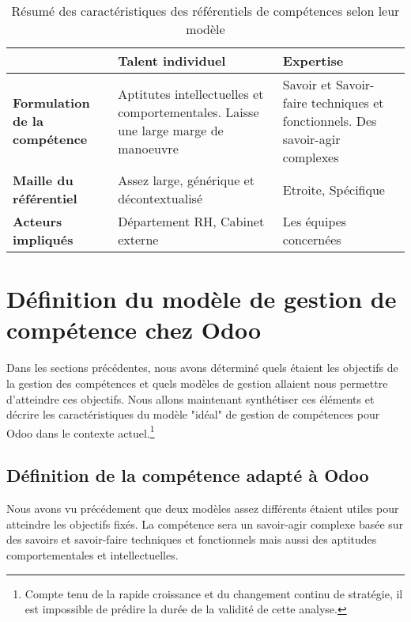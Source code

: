 \begin{table}[H]
  \caption{Résumé des caractéristiques des référentiels de compétences selon leur modèle}
  \label{model_comp}

  \begin{center}
    \begin{tabular}{p{}p{}p{}}
      & \textbf{Talent individuel} & \textbf{Expertise} \\
      \hline
      \textbf{Formulation de la compétence} & Aptitutes intellectuelles et comportementales. Laisse une large marge de manoeuvre & Savoir et Savoir-faire techniques et fonctionnels. Des savoir-agir complexes\\
      \textbf{Maille du référentiel} & Assez large, générique et décontextualisé & Etroite, Spécifique\\
      \textbf{Acteurs impliqués}  & Département RH, Cabinet externe &  Les équipes concernées\\
  
    \end{tabular}
  \end{center}
\end{table}

\section{Définition du modèle de gestion de compétence chez Odoo}
Dans les sections précédentes, nous avons déterminé quels étaient les objectifs de la gestion des compétences et quels modèles de gestion allaient nous permettre d'atteindre ces objectifs. Nous allons maintenant synthétiser ces éléments et décrire les caractéristiques du modèle "idéal" de gestion de compétences pour Odoo dans le contexte actuel.\footnote{Compte tenu de la rapide croissance et du changement continu de stratégie, il est impossible de prédire la durée de la validité de cette analyse.} 

\subsection{Définition de la compétence adapté à Odoo}
Nous avons vu précédement que deux modèles assez différents étaient utiles pour atteindre les objectifs fixés. La compétence sera un savoir-agir complexe basée sur des savoirs et savoir-faire techniques et fonctionnels mais aussi des aptitudes comportementales et intellectuelles. 

